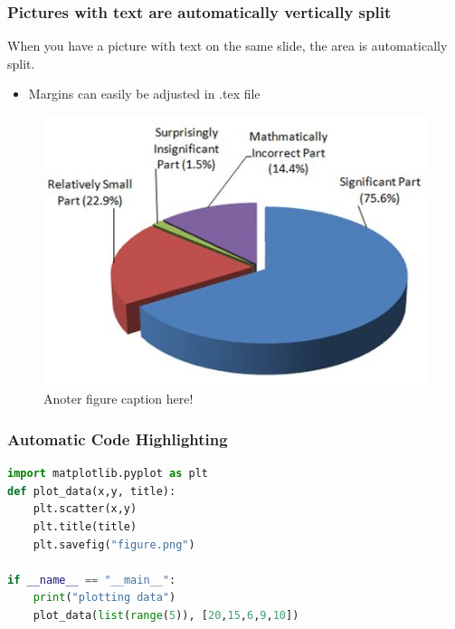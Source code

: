 \documentclass{beamer}
\begin{document}
\begin{frame}[fragile]
    \frametitle{Pictures with text are automatically vertically split}

	\begin{minipage}{0.4\textwidth}
When you have a picture with text on the same slide, the area is automatically split.
\begin{itemize}
\item Margins can easily be adjusted in .tex file

\end{itemize}

	\end{minipage}%
	\hfill
	\begin{minipage}{0.55\textwidth}

    \begin{figure}
        \centering
        \includegraphics[width=\textwidth]{./figs/pie_chart.jpg}
        \caption{Anoter figure caption here!}
    \end{figure}	\end{minipage}

\end{frame}


\begin{frame}[fragile]
    \frametitle{Automatic Code Highlighting}

\begin{lstlisting}[language=python]
import matplotlib.pyplot as plt
def plot_data(x,y, title):
    plt.scatter(x,y)
    plt.title(title)
    plt.savefig("figure.png")

if __name__ == "__main__":
    print("plotting data")
    plot_data(list(range(5)), [20,15,6,9,10])
\end{lstlisting}


\end{frame}
\end{document}
